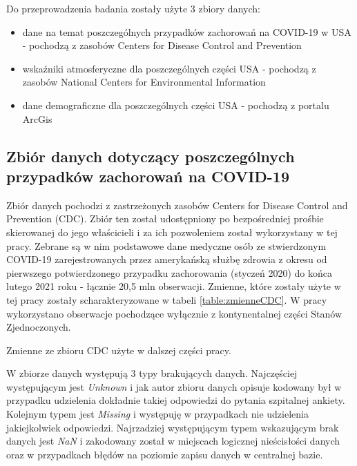 \documentclass[polish, twoside, 12pt, a4paper]{article}
\theoremstyle{definition}
\theoremstyle{plain}
\theoremstyle{remark}
\begin{document}

Do przeprowadzenia badania zostały użyte 3 zbiory danych: 
\begin{itemize}
  \item dane na temat poszczególnych przypadków zachorowań na COVID-19 w USA - pochodzą z zasobów Centers for Disease Control and Prevention
  \item wskaźniki atmosferyczne dla poszczególnych części USA - pochodzą z zasobów National Centers for Environmental Information
  \item dane demograficzne  dla poszczególnych części USA - pochodzą z portalu ArcGis
\end{itemize}

\subsection{Zbiór danych dotyczący poszczególnych przypadków zachorowań na COVID-19}

Zbiór danych pochodzi z zastrzeżonych zasobów Centers for Disease Control and Prevention (CDC). Zbiór ten został udostępniony po bezpośredniej prośbie skierowanej do jego właścicieli i za ich pozwoleniem został wykorzystany w tej pracy. Zebrane są w nim podstawowe dane medyczne osób ze stwierdzonym COVID-19 zarejestrowanych przez amerykańską służbę zdrowia z okresu od pierwszego potwierdzonego przypadku zachorowania (styczeń 2020) do końca lutego 2021 roku - łącznie 20,5 mln obserwacji. Zmienne, które zostały użyte w tej pracy zostały scharakteryzowane w tabeli \ref{table:zmienneCDC}. W pracy wykorzystano obserwacje pochodzące wyłącznie z kontynentalnej części Stanów Zjednoczonych.

\begin{table}[H]
  \centering
{}
\caption{Zmienne ze zbioru CDC użyte w dalszej części pracy.}
\label{table:zmienneCDC}
\end{table}

W zbiorze danych występują 3 typy brakujących danych. Najczęściej występującym jest \emph{Unknown} i jak autor zbioru danych opisuje kodowany był w przypadku udzielenia dokładnie takiej odpowiedzi do pytania szpitalnej ankiety. Kolejnym typem jest  \emph{Missing} i występuję w przypadkach nie udzielenia jakiejkolwiek odpowiedzi. Najrzadziej występującym typem wskazującym brak danych jest \emph{NaN} i zakodowany został w miejscach logicznej nieścisłości danych oraz w przypadkach błędów na poziomie zapisu danych w centralnej bazie.
\end{document}
